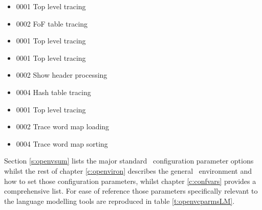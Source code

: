 \begin{itemize}
\item 0001       Top level tracing
\item 0002       FoF table tracing
\end{itemize}

\begin{itemize}
\item 0001       Top level tracing
\end{itemize}

\begin{itemize}
\item 0001       Top level tracing
\item 0002       Show header processing
\item 0004       Hash table tracing
\end{itemize}

\begin{itemize}
\item 0001       Top level tracing
\item 0002       Trace word map loading
\item 0004       Trace word map sorting
\end{itemize}


Section \ref{s:openvsum} lists the major standard \HTK\ configuration
parameter options whilst the rest of chapter \ref{c:openviron}
describes the general \HTK\ environment and how to set those
configuration parameters, whilst chapter \ref{c:confvars} provides a
comprehensive list.  For ease of reference those parameters
specifically relevant to the language modelling tools are reproduced
in table \ref{t:openvcparmsLM}.

